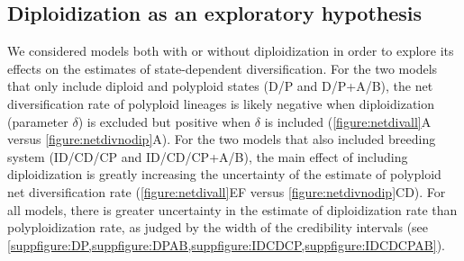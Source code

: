 \subsection{Diploidization as an exploratory hypothesis}

We considered models both with or without diploidization in order to explore its effects on the estimates of state-dependent diversification.
For the two models that only include diploid and polyploid states (D/P and D/P+A/B), the net diversification rate of polyploid lineages is likely negative when diploidization (parameter $\delta$) is excluded but positive when $\delta$ is included (\cref{figure:netdivall}A versus \cref{figure:netdivnodip}A).
For the two models that also included breeding system (ID/CD/CP and ID/CD/CP+A/B), the main effect of including diploidization is greatly increasing the uncertainty of the estimate of polyploid net diversification rate (\cref{figure:netdivall}EF versus \cref{figure:netdivnodip}CD).
For all models, there is greater uncertainty in the estimate of diploidization rate than polyploidization rate, as judged by the width of the credibility intervals (see \cref{suppfigure:DP,suppfigure:DPAB,suppfigure:IDCDCP,suppfigure:IDCDCPAB}).



